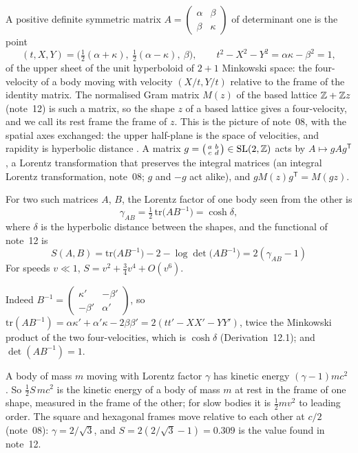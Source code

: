 \documentclass[11pt]{article}
\begin{document}
A positive definite symmetric matrix $A = \left(\begin{smallmatrix}\alpha&\beta\\\beta&\kappa\end{smallmatrix}\right)$ of determinant one is the point
\[
  (t,X,Y) = \bigl(\tfrac12(\alpha+\kappa),\ \tfrac12(\alpha-\kappa),\ \beta\bigr),\qquad t^2-X^2-Y^2 = \alpha\kappa-\beta^2 = 1,
\]
of the upper sheet of the unit hyperboloid of $2+1$ Minkowski space: the four-velocity of a body moving with velocity $(X/t,Y/t)$ relative to the frame of the identity matrix.
The normalised Gram matrix $M(z)$ of the based lattice $\mathbb{Z}+\mathbb{Z} z$ (note~12) is such a matrix, so the shape $z$ of a based lattice gives a four-velocity, and we call its rest frame the frame of $z$.
This is the picture of note~08, with the spatial axes exchanged: the upper half-plane is the space of velocities, and rapidity is hyperbolic distance \cite{RhodesSemon}.
A matrix $g = \left(\begin{smallmatrix}a&b\\c&d\end{smallmatrix}\right)\in\mathrm{SL}(2,\mathbb{Z})$ acts by $A\mapsto gAg^{\mathsf T}$, a Lorentz transformation that preserves the integral matrices (an integral Lorentz transformation, note~08; $g$ and $-g$ act alike), and $gM(z)g^{\mathsf T} = M(gz)$.

\begin{derivation}\label{d:energy}
For two such matrices $A$, $B$, the Lorentz factor of one body seen from the other is
\[
  \gamma_{AB} = \tfrac12\,\mathrm{tr}\bigl(AB^{-1}\bigr) = \cosh\delta,
\]
where $\delta$ is the hyperbolic distance between the shapes, and the functional of note~12 is
\[
  \boxed{\;S(A,B) = \mathrm{tr}\bigl(AB^{-1}\bigr)-2-\log\det\bigl(AB^{-1}\bigr) = 2(\gamma_{AB}-1)\;}
\]
For speeds $v\ll1$, $S = v^2+\tfrac34v^4+O(v^6)$.
\end{derivation}

\noindent
Indeed $B^{-1} = \left(\begin{smallmatrix}\kappa'&-\beta'\\-\beta'&\alpha'\end{smallmatrix}\right)$, so $\mathrm{tr}(AB^{-1}) = \alpha\kappa'+\alpha'\kappa-2\beta\beta' = 2(tt'-XX'-YY')$, twice the Minkowski product of the two four-velocities, which is $\cosh\delta$ (Derivation~12.1); and $\det(AB^{-1}) = 1$.

\physical
A body of mass $m$ moving with Lorentz factor $\gamma$ has kinetic energy $(\gamma-1)mc^2$ \cite{Rindler}.
So $\tfrac12S\,mc^2$ is the kinetic energy of a body of mass $m$ at rest in the frame of one shape, measured in the frame of the other; for slow bodies it is $\tfrac12mv^2$ to leading order.
The square and hexagonal frames move relative to each other at $c/2$ (note~08): $\gamma = 2/\sqrt3$, and $S = 2(2/\sqrt3-1) = 0.309$ is the value found in note~12.
\end{document}
